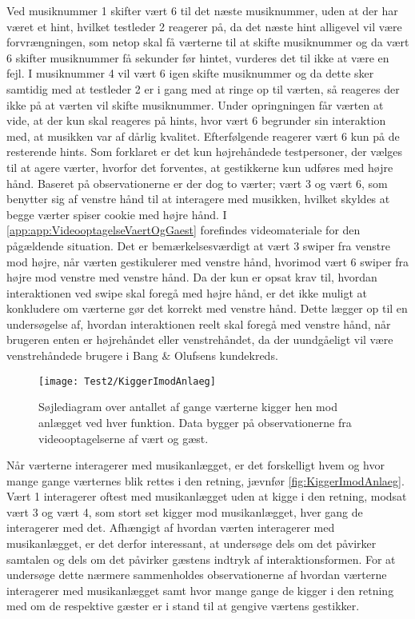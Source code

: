Ved musiknummer 1 skifter vært 6 til det næste musiknummer, uden at der har været et hint, hvilket testleder 2 reagerer på, da det næste hint alligevel vil være forvrængningen, som netop skal få værterne til at skifte musiknummer og da vært 6 skifter musiknummer få sekunder før hintet, vurderes det til ikke at være en fejl. I musiknummer 4 vil vært 6 igen skifte musiknummer og da dette sker samtidig med at testleder 2 er i gang med at ringe op til værten, så reageres der ikke på at værten vil skifte musiknummer. Under opringningen får værten at vide, at der kun skal reageres på hints, hvor vært 6 begrunder sin interaktion med, at musikken var af dårlig kvalitet. Efterfølgende reagerer vært 6 kun på de resterende hints.\blankline
%
Som forklaret er det kun højrehåndede testpersoner, der vælges til at agere værter, hvorfor det forventes, at gestikkerne kun udføres med højre hånd. Baseret på observationerne er der dog to værter; vært 3 og vært 6, som benytter sig af venstre hånd til at interagere med musikken, hvilket skyldes at begge værter spiser cookie med højre hånd. I \autoref{app:app:VideooptagelseVaertOgGaest} forefindes videomateriale for den pågældende situation. Det er bemærkelsesværdigt at vært 3 swiper fra venstre mod højre, når værten gestikulerer med venstre hånd, hvorimod vært 6 swiper fra højre mod venstre med venstre hånd. Da der kun er opsat krav til, hvordan interaktionen ved swipe skal foregå med højre hånd, er det ikke muligt at konkludere om værterne gør det korrekt med venstre hånd. Dette lægger op til en undersøgelse af, hvordan interaktionen reelt skal foregå med venstre hånd, når brugeren enten er højrehåndet eller venstrehåndet, da der uundgåeligt vil være venstrehåndede brugere i Bang $\&$ Olufsens kundekreds.     
%
\begin{figure}[H]
	\centering
	\texttt{[image: Test2/KiggerImodAnlaeg]}
	\caption{Søjlediagram over antallet af gange værterne kigger hen mod anlægget ved hver funktion. Data bygger på observationerne fra videooptagelserne af vært og gæst.}
	\label{fig:KiggerImodAnlaeg}
\end{figure}
\noindent
% 
Når værterne interagerer med musikanlægget, er det forskelligt hvem og hvor mange gange værternes blik rettes i den retning, jævnfør \autoref{fig:KiggerImodAnlaeg}. Vært 1 interagerer oftest med musikanlægget uden at kigge i den retning, modsat vært 3 og vært 4, som stort set kigger mod musikanlægget, hver gang de interagerer med det. Afhængigt af hvordan værten interagerer med musikanlægget, er det derfor interessant, at undersøge dels om det påvirker samtalen og dels om det påvirker gæstens indtryk af interaktionsformen. For at undersøge dette nærmere sammenholdes observationerne af hvordan værterne interagerer med musikanlægget samt hvor mange gange de kigger i den retning med om de respektive gæster er i stand til at gengive værtens gestikker. 

